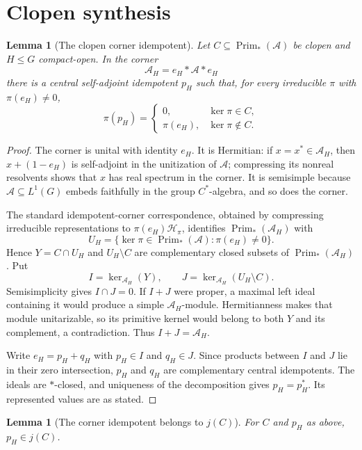 \documentclass[11pt]{article}
\newtheorem{lemma}[theorem]{Lemma}
\newcommand{\A}{\mathcal A}
\newcommand{\Prim}{\operatorname{Prim}}
\begin{document}
\section{Clopen synthesis}

\begin{lemma}[The clopen corner idempotent]\label{lem:corner}
Let $C\subseteq\Prim_*(\A)$ be clopen and $H\leq G$ compact-open.  In the
corner
\[
 \A_H=e_H*\A*e_H
\]
there is a central self-adjoint idempotent $p_H$ such that, for every
irreducible $\pi$ with $\pi(e_H)\ne0$,
\[
 \pi(p_H)=
 \begin{cases}
 0,&\ker\pi\in C,\\
 \pi(e_H),&\ker\pi\notin C.
 \end{cases}
\]
\end{lemma}

\begin{proof}
The corner is unital with identity $e_H$.  It is Hermitian: if
$x=x^*\in\A_H$, then $x+(1-e_H)$ is self-adjoint in the unitization of $\A$;
compressing its nonreal resolvents shows that $x$ has real spectrum in the
corner.  It is semisimple because $\A\subseteq L^1(G)$ embeds faithfully in
the group $C^*$-algebra, and so does the corner.

The standard idempotent-corner correspondence, obtained by compressing
irreducible representations to $\pi(e_H)\mathcal H_\pi$, identifies
$\Prim_*(\A_H)$ with
\[
 U_H=\{\ker\pi\in\Prim_*(\A):\pi(e_H)\ne0\}.
\]
Hence $Y=C\cap U_H$ and $U_H\setminus C$ are complementary closed subsets of
$\Prim_*(\A_H)$.  Put
\[
 I=\ker_{\A_H}(Y),\qquad
 J=\ker_{\A_H}(U_H\setminus C).
\]
Semisimplicity gives $I\cap J=0$.  If $I+J$ were proper, a maximal left ideal
containing it would produce a simple $\A_H$-module.  Hermitianness makes that
module unitarizable, so its primitive kernel would belong to both $Y$ and its
complement, a contradiction.  Thus $I+J=\A_H$.

Write $e_H=p_H+q_H$ with $p_H\in I$ and $q_H\in J$.  Since products between
$I$ and $J$ lie in their zero intersection, $p_H$ and $q_H$ are complementary
central idempotents.  The ideals are $*$-closed, and uniqueness of the
decomposition gives $p_H=p_H^*$.  Its represented values are as stated.
\end{proof}

\begin{lemma}[The corner idempotent belongs to $j(C)$]\label{lem:riesz}
For $C$ and $p_H$ as above, $p_H\in j(C)$.
\end{lemma}
\end{document}
